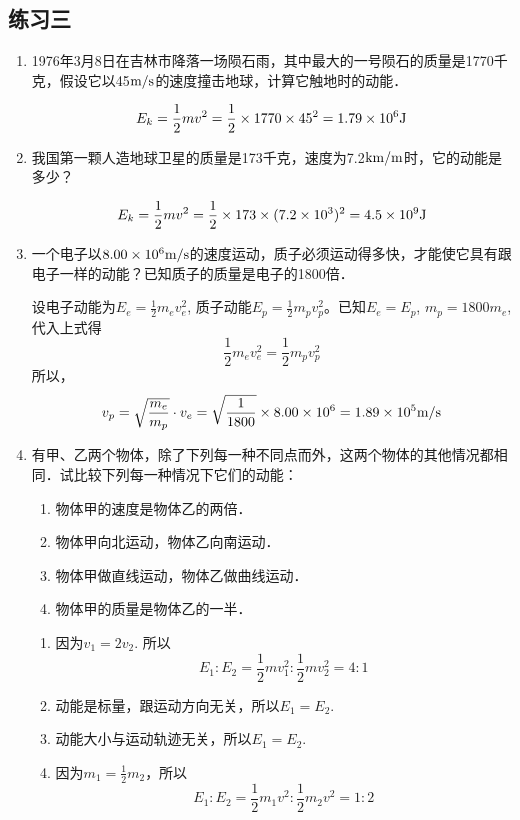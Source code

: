 \subsection{练习三}
\begin{enumerate}
    \item 1976年3月8日在吉林市降落一场陨石雨，其中最大的一号陨石的质量是1770千克，假设它以45$\text{m}/\text{s}$的速度撞击地球，计算它触地时的动能．

    \begin{solution}
\[E_k=\frac{1}{2}mv^2=\frac{1}{2}\times 1770\times 45^2=1.79\times 10^6{\rm J}\]
    \end{solution}
    \item 我国第一颗人造地球卫星的质量是173千克，速度为7.2${\rm km}/{\rm m}$时，它的动能是多少？

    \begin{solution}
    \[E_k=\frac{1}{2}mv^2=\frac{1}{2}\times 173\times (7.2\times 10^3)^2=4.5\times 10^9{\rm J}\]
    \end{solution}
    \item 一个电子以$8.00\times 10^6\text{m}/\text{s}$的速度运动，质子必须运动得多快，才能使它具有跟电子一样的动能？已知质子的质量是电子的1800倍．

    \begin{solution}
设电子动能为$E_e=\frac{1}{2}m_e v_e^2$, 质子动能$E_p=\frac{1}{2}m_pv_p^2$。已知$E_e=E_p$, $m_p=1800m_e$, 代入上式得
\[\frac{1}{2}m_e v_e^2=\frac{1}{2}m_p v_p^2\]
所以，
\[v_p=\sqrt{\frac{m_e}{m_p}}\cdot v_e=\sqrt{\frac{1}{1800}}\times 8.00\times 10^6=1.89\times 10^5\text{m}/\text{s}\]
    \end{solution}
    \item 有甲、乙两个物体，除了下列每一种不同点而外，这两个物体的其他情况都相同．试比较下列每一种情况下它们的动能：
    \begin{enumerate}
        \item 物体甲的速度是物体乙的两倍．
        \item 物体甲向北运动，物体乙向南运动．
        \item 物体甲做直线运动，物体乙做曲线运动．
        \item 物体甲的质量是物体乙的一半．
    \end{enumerate}

    \begin{solution}
\begin{enumerate}
    \item 因为$v_1=2v_2$. 所以
    \[E_1:E_2=\frac{1}{2}mv_1^2 :\frac{1}{2}mv_2^2=4:1\]
    \item 动能是标量，跟运动方向无关，所以$E_1=E_2$.
    \item 动能大小与运动轨迹无关，所以$E_1=E_2$.
    \item 因为$m_1=\frac{1}{2}m_2$，所以
    \[E_1:E_2=\frac{1}{2}m_1v^2 :\frac{1}{2}m_2v^2=1:2\]
\end{enumerate}
    \end{solution}
\end{enumerate}




